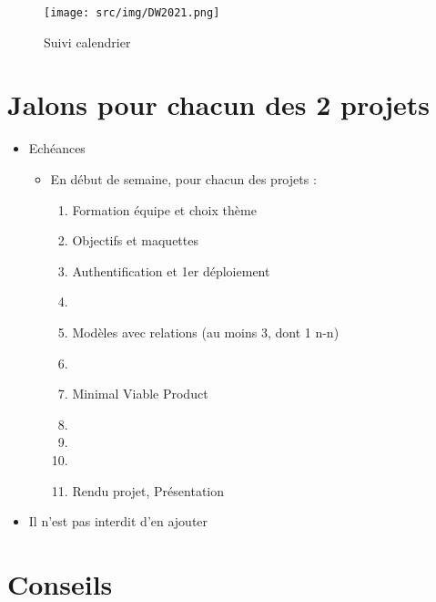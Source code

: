 \begin{figure}
\centering
\texttt{[image: src/img/DW2021.png]}
\caption{Suivi calendrier}
\end{figure}

\hypertarget{jalons-pour-chacun-des-2-projets}{%
\section{Jalons pour chacun des 2
projets}\label{jalons-pour-chacun-des-2-projets}}

\begin{itemize}
\tightlist
\item
  Echéances

  \begin{itemize}
  \tightlist
  \item
    En début de semaine, pour chacun des projets :

    \begin{enumerate}
    \def\labelenumi{\arabic{enumi}.}
    \tightlist
    \item
      Formation équipe et choix thème
    \item
      Objectifs et maquettes
    \item
      Authentification et 1er déploiement
    \item
    \item
      Modèles avec relations (au moins 3, dont 1 n-n)
    \item
    \item
      Minimal Viable Product
    \item
    \item
    \item
    \item
      Rendu projet, Présentation
    \end{enumerate}
  \end{itemize}
\item
  Il n'est pas interdit d'en ajouter
\end{itemize}

\hypertarget{conseils}{%
\section{Conseils}\label{conseils}}

